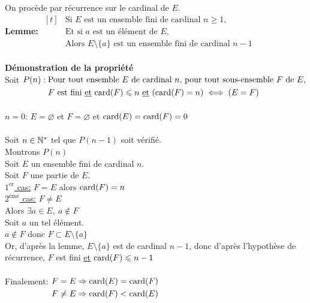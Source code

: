 \documentclass[12pt,twoside,a4paper]{article}
\begin{document}
	\begin{preuve}
		On procède par récurrence sur le cardinal de $E$.\\
		\textbf{Lemme:}
		$\begin{aligned}[t]
			&\text{Si }E\text{ est un ensemble fini de cardinal }n\geqslant 1,\\
			&\text{Et si }a\text{ est un élément de }E,\\
			&\text{Alors }E\setminus \{a\}\text{ est un ensemble fini de cardinal }n-1
		\end{aligned}$\\
		\\
		\textbf{Démonstration de la propriété}\\
		Soit $P(n):
		\begin{aligned}[t]
			&\text{Pour tout ensemble }E\text{ de cardinal }n\text{, pour tout sous-ensemble }F\text{ de }E\text{,}\\
			&\text{}F\text{ est fini \underline{et} }\text{card}(F)\leqslant n\text{ \underline{et} }(\text{card}(F)=n)\iff(E=F)
		\end{aligned}$\\
		\\
		\underline{$n=0$}: $E=\varnothing$ et $F=\varnothing$ et $\text{card}(E)=\text{card}(F)=0$\\
		\\
		Soit $n\in\mathbb{N}^*$ tel que $P(n-1)$ soit vérifié.\\
		Montrons $P(n)$\\
		Soit $E$ un ensemble fini de cardinal $n$.\\
		Soit $F$ une partie de $E$.\\
		\underline{$1^{\text{er}}$ cas:} $F=E$ alors $\text{card}(F)=n$\\
		\underline{$2^{\text{ème}}$ cas:} $F\neq E$\\
		Alors $\exists a\in E,\ a\notin F$\\
		Soit $a$ un tel élément.\\
		$a\notin F$ donc $F\subset E\setminus\{a\}$\\
		Or, d'après la lemme, $E\setminus\{a\}$ est de cardinal $n-1$, donc d'après l'hypothèse de récurrence, $F$ est fini \underline{et} $\text{card}(F)\leqslant n-1$\\
		\\
		Finalement: 
		$\begin{aligned}[t]
			& F=E\Rightarrow \text{card}(E)=\text{card}(F)\\
			& F\neq E\Rightarrow \text{card}(F)<\text{card}(E)
		\end{aligned}$\\

\end{preuve}
\end{document}
